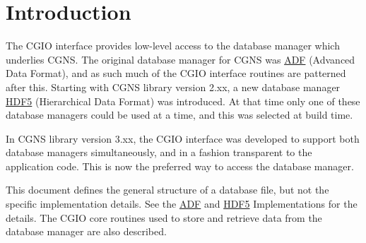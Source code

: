 \section{Introduction}
\label{s:intro}
\thispagestyle{plain}

The CGIO interface provides low-level access to the database manager which
underlies CGNS. The original database manager for CGNS was
\href{../adf/adf.pdf}{ADF} (Advanced Data Format), and as such
much of the CGIO interface routines are patterned after this. Starting
with CGNS library version 2.xx, a new database manager
\href{../hdf5/hdf5.pdf}{HDF5} (Hierarchical Data Format) was
introduced. At that time only one of these database managers could be used
at a time, and this was selected at build time.

In CGNS library version 3.xx, the CGIO interface was developed to support
both database managers simultaneously, and in a fashion transparent to
the application code. This is now the preferred way to access the database
manager.

This document defines the general structure of a database file, but not
the specific implementation details. See the
\href{../adf/adf.pdf}{ADF} and \href{../hdf5/hdf5.pdf}{HDF5}
Implementations for the details.
The CGIO core routines used to store and retrieve data from the
database manager are also described.

